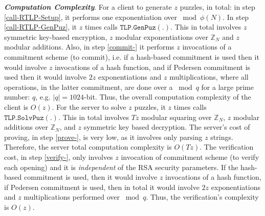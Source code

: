  

 \noindent\textbf{\textit{Computation Complexity}}. For a client to generate $z$ puzzles, in total: in step \ref{call-RTLP-Setup}, it performs one exponentiation over $\bmod \phi(N)$. In step \ref{call-RTLP-GenPuz}, it $z$ times calls $\mathtt{TLP.GenPuz}(.)$. This  in total involves $z$ symmetric key-based encryption,  $z$ modular exponentiations over $\mathbb{Z}_{\scriptscriptstyle N}$ and $z$ modular additions. Also, in  step \ref{commit-} it performs $z$ invocations of a commitment scheme (to commit), i.e. if a hash-based commitment is used then it would involve $z$ invocations of a hash function, and if Pedersen commitment is used then it would involve $2 z$ exponentiations and $z$ multiplications, where  all operations, in the latter commitment,  are done  over a $\bmod q$ for a large prime number: $q$, e.g. $|q|=1024$-bit. Thus, the overall computation complexity of the client   is $O(z)$. For the server to solve $z$ puzzles, it $z$ times calls $\mathtt{TLP.SolvPuz}(.)$. This in total involves $Tz$ modular squaring over $\mathbb{Z}_{\scriptscriptstyle N}$, $z$ modular additions over $\mathbb{Z}_{\scriptscriptstyle N}$, and  $z$ symmetric key based decryption. The server's cost of proving, in step \ref{prove-}, is very low, as it involves only parsing $z$ strings. Therefore, the server total computation complexity is $O(Tz)$. The verification cost, in step \ref{verify-}, only involves $z$ invocation of commitment scheme (to verify  each opening) and it is \emph{independent} of the RSA security parameters.  If the hash-based commitment is used, then it would involve $z$ invocations of a hash function,  if Pedersen commitment is used, then in total it would involve $2 z$ exponentiations and $z$ multiplications performed over $\bmod q$. Thus, the  verification's complexity is $O(z)$.




 
 
